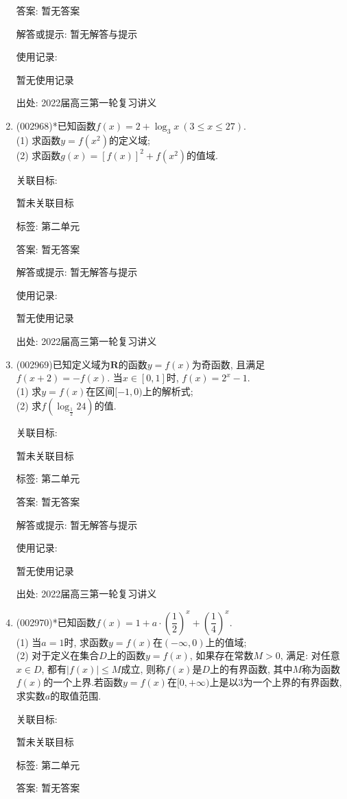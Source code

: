 \documentclass[10pt,a4paper]{article}
\begin{document}
\begin{enumerate}[1.]
答案: 暂无答案

解答或提示: 暂无解答与提示

使用记录:

暂无使用记录


出处: 2022届高三第一轮复习讲义
\item { (002968)}*已知函数$f(x)=2+\log_3 x\ (3\le x\le 27)$.\\
(1) 求函数$y=f(x^2)$的定义域;\\
(2) 求函数$g(x)={[f(x)]}^2+f(x^2)$的值域.


关联目标:

暂未关联目标



标签: 第二单元

答案: 暂无答案

解答或提示: 暂无解答与提示

使用记录:

暂无使用记录


出处: 2022届高三第一轮复习讲义
\item { (002969)}已知定义域为$\mathbf{R}$的函数$y=f(x)$为奇函数, 且满足$f(x+2)=-f(x)$. 当$x\in [0,1]$时, $f(x)=2^x-1$.\\
(1) 求$y=f(x)$在区间$[-1,0)$上的解析式;\\
(2) 求$f(\log_{\frac 12}24)$的值.


关联目标:

暂未关联目标



标签: 第二单元

答案: 暂无答案

解答或提示: 暂无解答与提示

使用记录:

暂无使用记录


出处: 2022届高三第一轮复习讲义
\item { (002970)}*已知函数$f(x)=1+a\cdot (\dfrac 12)^x+(\dfrac 14)^x$.\\
(1) 当$a=1$时, 求函数$y=f(x)$在$(-\infty,0)$上的值域;\\
(2) 对于定义在集合$D$上的函数$y=f(x)$, 如果存在常数$M>0$, 满足: 对任意$x\in D$, 都有$|f(x)|\le M$成立, 则称$f(x)$是$D$上的有界函数, 其中$M$称为函数$f(x)$的一个上界.若函数$y=f(x)$在$[0,+\infty)$上是以$3$为一个上界的有界函数, 求实数$a$的取值范围.


关联目标:

暂未关联目标



标签: 第二单元

答案: 暂无答案


\end{enumerate}
\end{document}
